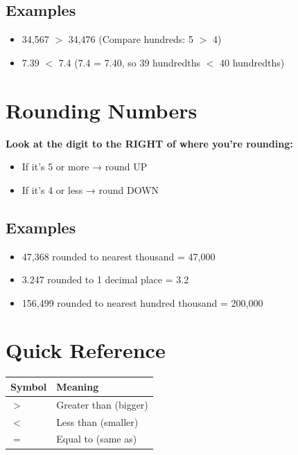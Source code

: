 \documentclass[a4paper,11pt]{article}
\begin{document}
\subsection{Examples}
\begin{itemize}
    \item 34,567 $>$ 34,476 (Compare hundreds: 5 $>$ 4)
    \item 7.39 $<$ 7.4 (7.4 = 7.40, so 39 hundredths $<$ 40 hundredths)
\end{itemize}

\section{Rounding Numbers}

\begin{tcolorbox}[colback=red!5!white,colframe=red!75!black,title=\textbf{Rounding Rules}]
\textbf{Look at the digit to the RIGHT of where you're rounding:}
\begin{itemize}
    \item If it's 5 or more → round UP
    \item If it's 4 or less → round DOWN
\end{itemize}
\end{tcolorbox}

\subsection{Examples}
\begin{itemize}
    \item 47,368 rounded to nearest thousand = 47,000
    \item 3.247 rounded to 1 decimal place = 3.2
    \item 156,499 rounded to nearest hundred thousand = 200,000
\end{itemize}

\section{Quick Reference}

\begin{center}
\begin{tabular}{|l|l|}
\hline
\textbf{Symbol} & \textbf{Meaning} \\
\hline
$>$ & Greater than (bigger) \\
\hline
$<$ & Less than (smaller) \\
\hline
$=$ & Equal to (same as) \\
\hline
\end{tabular}
\end{center}
\end{document}
